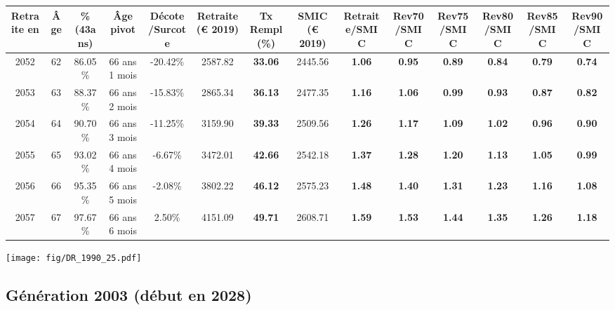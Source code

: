 \begin{adjustbox}{max width=\textwidth} 
\begin{tabular}[htb]{|c|c||c|c|c||c|c||c||c|c|c|c|c|c|} 
\hline 
 Retraite en &  Âge &  \%(43ans) &  Âge pivot &  Décote/Surcote &  Retraite (\euro{} 2019) &  Tx Rempl(\%) &  SMIC (\euro{} 2019) &  Retraite/SMIC &  Rev70/SMIC &  Rev75/SMIC &  Rev80/SMIC &  Rev85/SMIC &  Rev90/SMIC \\ 
\hline \hline 
 2052 &  62 &  86.05\% &  66 ans 1 mois &  -20.42\% &  2587.82 &  {\bf 33.06} &  2445.56 &  {\bf 1.06} &  {\bf {\color{red} 0.95}} &  {\bf {\color{red} 0.89}} &  {\bf {\color{red} 0.84}} &  {\bf {\color{red} 0.79}} &  {\bf {\color{red} 0.74}} \\ 
\hline 
 2053 &  63 &  88.37\% &  66 ans 2 mois &  -15.83\% &  2865.34 &  {\bf 36.13} &  2477.35 &  {\bf 1.16} &  {\bf 1.06} &  {\bf {\color{red} 0.99}} &  {\bf {\color{red} 0.93}} &  {\bf {\color{red} 0.87}} &  {\bf {\color{red} 0.82}} \\ 
\hline 
 2054 &  64 &  90.70\% &  66 ans 3 mois &  -11.25\% &  3159.90 &  {\bf 39.33} &  2509.56 &  {\bf 1.26} &  {\bf 1.17} &  {\bf 1.09} &  {\bf 1.02} &  {\bf {\color{red} 0.96}} &  {\bf {\color{red} 0.90}} \\ 
\hline 
 2055 &  65 &  93.02\% &  66 ans 4 mois &  -6.67\% &  3472.01 &  {\bf 42.66} &  2542.18 &  {\bf 1.37} &  {\bf 1.28} &  {\bf 1.20} &  {\bf 1.13} &  {\bf 1.05} &  {\bf {\color{red} 0.99}} \\ 
\hline 
 2056 &  66 &  95.35\% &  66 ans 5 mois &  -2.08\% &  3802.22 &  {\bf 46.12} &  2575.23 &  {\bf 1.48} &  {\bf 1.40} &  {\bf 1.31} &  {\bf 1.23} &  {\bf 1.16} &  {\bf 1.08} \\ 
\hline 
 2057 &  67 &  97.67\% &  66 ans 6 mois &  2.50\% &  4151.09 &  {\bf 49.71} &  2608.71 &  {\bf 1.59} &  {\bf 1.53} &  {\bf 1.44} &  {\bf 1.35} &  {\bf 1.26} &  {\bf 1.18} \\ 
\hline 
\hline 
\end{tabular} 
\end{adjustbox} 
 
 \vspace{0.1cm} 

 \begin{center}\texttt{[image: fig/DR\_1990\_25.pdf]}\end{center} \label{fig/DR_1990_25.pdf} 

\newpage 
 
\subsection{Génération 2003 (début en 2028)} 

